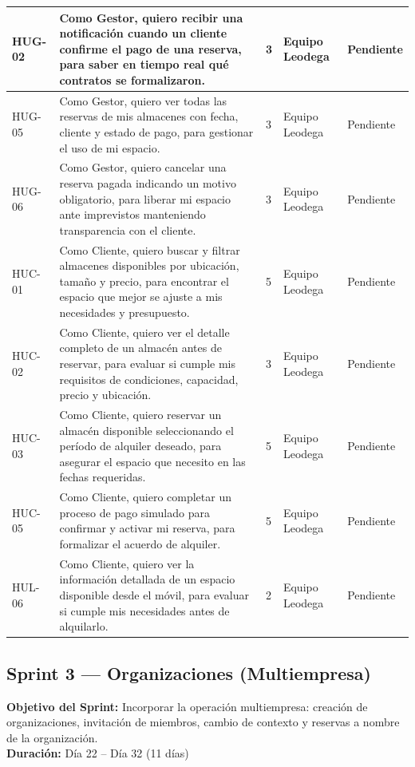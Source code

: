 {\begin{longtable}{|M{1.6cm}|L{7.0cm}|M{1.4cm}|M{2.4cm}|M{1.8cm}|}
HUG-02 & Como Gestor, quiero recibir una notificación cuando un cliente confirme el pago de una reserva, para saber en tiempo real qué contratos se formalizaron. & 3 & Equipo Leodega & Pendiente \\ \hline
HUG-05 & Como Gestor, quiero ver todas las reservas de mis almacenes con fecha, cliente y estado de pago, para gestionar el uso de mi espacio. & 3 & Equipo Leodega & Pendiente \\ \hline
HUG-06 & Como Gestor, quiero cancelar una reserva pagada indicando un motivo obligatorio, para liberar mi espacio ante imprevistos manteniendo transparencia con el cliente. & 3 & Equipo Leodega & Pendiente \\ \hline
HUC-01 & Como Cliente, quiero buscar y filtrar almacenes disponibles por ubicación, tamaño y precio, para encontrar el espacio que mejor se ajuste a mis necesidades y presupuesto. & 5 & Equipo Leodega & Pendiente \\ \hline
HUC-02 & Como Cliente, quiero ver el detalle completo de un almacén antes de reservar, para evaluar si cumple mis requisitos de condiciones, capacidad, precio y ubicación. & 3 & Equipo Leodega & Pendiente \\ \hline
HUC-03 & Como Cliente, quiero reservar un almacén disponible seleccionando el período de alquiler deseado, para asegurar el espacio que necesito en las fechas requeridas. & 5 & Equipo Leodega & Pendiente \\ \hline
HUC-05 & Como Cliente, quiero completar un proceso de pago simulado para confirmar y activar mi reserva, para formalizar el acuerdo de alquiler. & 5 & Equipo Leodega & Pendiente \\ \hline
HUL-06 & Como Cliente, quiero ver la información detallada de un espacio disponible desde el móvil, para evaluar si cumple mis necesidades antes de alquilarlo. & 2 & Equipo Leodega & Pendiente \\ \hline
\end{longtable}
}
\clearpage

\subsection{Sprint 3 --- Organizaciones (Multiempresa)}
\textbf{Objetivo del Sprint:} Incorporar la operación multiempresa: creación de organizaciones, invitación de miembros, cambio de contexto y reservas a nombre de la organización.\\
\textbf{Duración:} Día 22 -- Día 32 (11 días)

